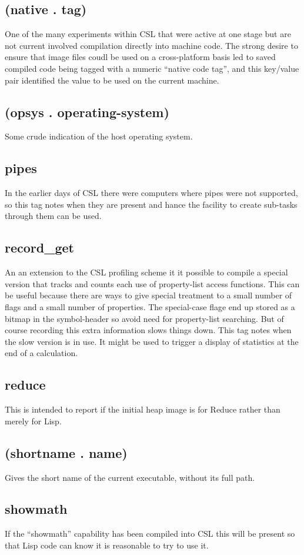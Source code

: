 \documentclass[a4paper,11pt]{article}
\begin{document}
\subsection{\ttfamily (native . tag)}
One of the many experiments within CSL that were active at one stage but are
not current involved compilation directly into machine code. The strong
desire to ensure that image files coudl be used on a cross-platform basis
led to saved compiled code being tagged with a numeric ``native code tag'',
and this key/value pair identified the value to be used on the current
machine.
\subsection{\ttfamily (opsys . operating-system)}
Some crude indication of the host operating system.
\subsection{\ttfamily pipes}
In the earlier days of CSL there were computers where pipes were not
supported, so this tag notes when they are present and hance the facility
to create sub-tasks through them can be used. 
\subsection{\ttfamily record\_get}
An an extension to the CSL profiling scheme it it possible to compile
a special version that tracks and counts each use of property-list access
functions. This can be useful because there are ways to give special
treatment to a small number of flags and a small number of properties. The
special-case flage end up stored as a bitmap in the symbol-header so avoid
need for property-list searching. But of course recording this extra
information slows things down. This tag notes when the slow version is
in use. It might be used to trigger a display of statistics at the end of
a calculation.
\subsection{\ttfamily reduce}
This is intended to report if the initial heap image is for Reduce rather than
merely for Lisp.
\subsection{\ttfamily (shortname . name)}
Gives the short name of the current executable, without its full path.
\subsection{\ttfamily showmath}
If the ``showmath'' capability has been compiled into CSL this will be present
so that Lisp code can know it is reasonable to try to use it.
\end{document}
